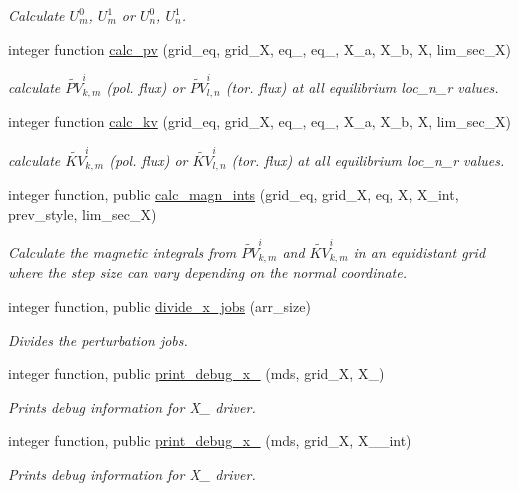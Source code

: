 \begin{DoxyCompactItemize}
\begin{DoxyCompactList}\small\item\em Calculate $U_m^0$, $U_m^1$ or $U_n^0$, $U_n^1$. \end{DoxyCompactList}\item 
integer function \hyperlink{namespacex__ops_a51f3bf0b4c8d688ffbcc3a1adbca9762}{calc\+\_\+pv} (grid\+\_\+eq, grid\+\_\+X, eq\+\_, eq\+\_, X\+\_\+a, X\+\_\+b, X, lim\+\_\+sec\+\_\+X)
\begin{DoxyCompactList}\small\item\em calculate $\widetilde{PV}_{k,m}^i$ (pol. flux) or $\widetilde{PV}_{l,n}^i$ (tor. flux) at all equilibrium {\ttfamily loc\+\_\+n\+\_\+r} values. \end{DoxyCompactList}\item 
integer function \hyperlink{namespacex__ops_a045e8903230dfa0fb8b89b458d0c8ee2}{calc\+\_\+kv} (grid\+\_\+eq, grid\+\_\+X, eq\+\_, eq\+\_, X\+\_\+a, X\+\_\+b, X, lim\+\_\+sec\+\_\+X)
\begin{DoxyCompactList}\small\item\em calculate $\widetilde{KV}_{k,m}^i$ (pol. flux) or $\widetilde{KV}_{l,n}^i$ (tor. flux) at all equilibrium {\ttfamily loc\+\_\+n\+\_\+r} values. \end{DoxyCompactList}\item 
integer function, public \hyperlink{namespacex__ops_a6df79622d1b95d54ab3e542751a5881d}{calc\+\_\+magn\+\_\+ints} (grid\+\_\+eq, grid\+\_\+X, eq, X, X\+\_\+int, prev\+\_\+style, lim\+\_\+sec\+\_\+X)
\begin{DoxyCompactList}\small\item\em Calculate the magnetic integrals from $\widetilde{PV}_{k,m}^i$ and $\widetilde{KV}_{k,m}^i$ in an equidistant grid where the step size can vary depending on the normal coordinate. \end{DoxyCompactList}\item 
integer function, public \hyperlink{namespacex__ops_a677c88d85fe1bfbf3579a2421ce16f2f}{divide\+\_\+x\+\_\+jobs} (arr\+\_\+size)
\begin{DoxyCompactList}\small\item\em Divides the perturbation jobs. \end{DoxyCompactList}\item 
integer function, public \hyperlink{namespacex__ops_a8bdd87db80570a01cf35ca50184ae879}{print\+\_\+debug\+\_\+x\+\_} (mds, grid\+\_\+X, X\+\_)
\begin{DoxyCompactList}\small\item\em Prints debug information for X\+\_ driver. \end{DoxyCompactList}\item 
integer function, public \hyperlink{namespacex__ops_a8879ea26ad86818e981546c3ab2d6165}{print\+\_\+debug\+\_\+x\+\_} (mds, grid\+\_\+X, X\+\_\+\_\+int)
\begin{DoxyCompactList}\small\item\em Prints debug information for X\+\_ driver. \end{DoxyCompactList}\end{DoxyCompactItemize}
